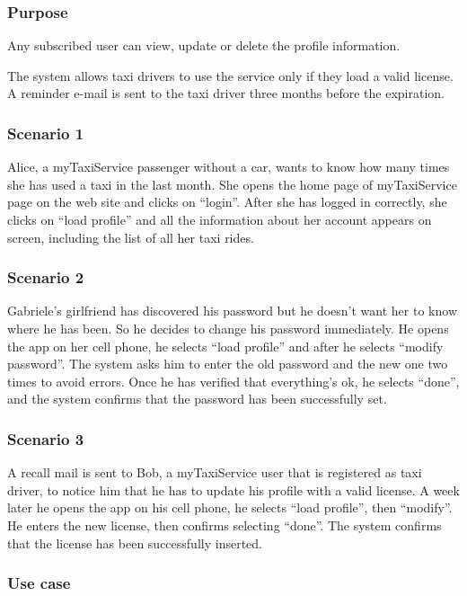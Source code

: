 \label{user-profile}
\subsubsection{Purpose}
Any subscribed user can view, update or delete the profile information.

The system allows taxi drivers to use the service only if they load a valid license. A reminder e-mail is sent to the taxi driver three months before the expiration.

\subsubsection{Scenario 1}
Alice, a myTaxiService passenger without a car, wants to know how many times she has used a taxi in the last month.
She opens the home page of myTaxiService page on the web site and clicks on ``login''.
After she has logged in correctly, she clicks on ``load profile'' and all the information about her account appears on screen, including the list of all her taxi rides.

\subsubsection{Scenario 2}
Gabriele's girlfriend has discovered his password but he doesn't want her to know where he has been. So he decides to change his password immediately. He opens the app on her cell phone, he selects ``load profile'' and after he selects ``modify password''. The system asks him to enter the old password and the new one two times to avoid errors. Once he has verified that everything's ok, he selects ``done'', and the system confirms that the password has been successfully set.

\subsubsection{Scenario 3}
A recall mail is sent to Bob, a myTaxiService user that is registered as taxi driver, to notice him that he has to update his profile with a valid license. A week later he opens the app on his cell phone, he selects ``load profile'', then ``modify''. He enters the new license, then confirms selecting ``done''. The system confirms that the license has been successfully inserted.

\subsubsection{Use case}


